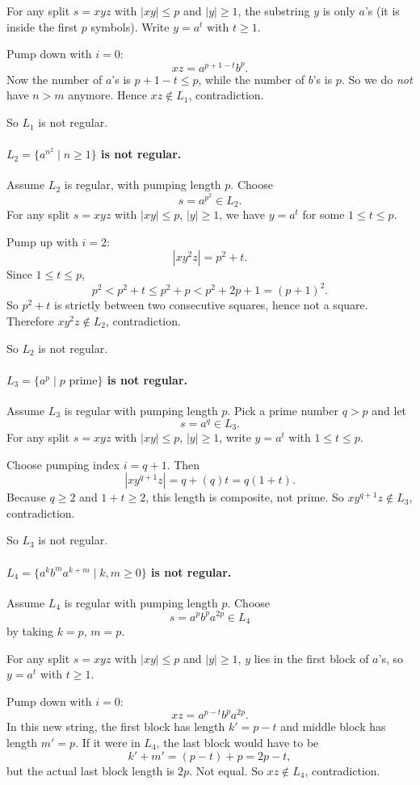 \documentclass{article}
\theoremstyle{theorem}
\theoremstyle{definition}
\theoremstyle{remark}
\begin{document}
For any split $s=xyz$ with $|xy|\le p$ and $|y|\ge 1$, the substring $y$ is only $a$'s (it is inside the first $p$ symbols). Write $y=a^t$ with $t\ge 1$.

Pump down with $i=0$:
\[
xz=a^{p+1-t}b^p.
\]
Now the number of $a$'s is $p+1-t\le p$, while the number of $b$'s is $p$. So we do \emph{not} have $n>m$ anymore. Hence $xz\notin L_1$, contradiction.

So $L_1$ is not regular.

\paragraph{$L_2=\{a^{n^2}\mid n\ge 1\}$ is not regular.}
Assume $L_2$ is regular, with pumping length $p$.
Choose
\[
s=a^{p^2}\in L_2.
\]
For any split $s=xyz$ with $|xy|\le p$, $|y|\ge 1$, we have $y=a^t$ for some $1\le t\le p$.

Pump up with $i=2$:
\[
|xy^2z|=p^2+t.
\]
Since $1\le t\le p$,
\[
p^2 < p^2+t \le p^2+p < p^2+2p+1=(p+1)^2.
\]
So $p^2+t$ is strictly between two consecutive squares, hence not a square. Therefore $xy^2z\notin L_2$, contradiction.

So $L_2$ is not regular.

\paragraph{$L_3=\{a^p\mid p\text{ prime}\}$ is not regular.}
Assume $L_3$ is regular with pumping length $p$.
Pick a prime number $q>p$ and let
\[
s=a^q\in L_3.
\]
For any split $s=xyz$ with $|xy|\le p$, $|y|\ge 1$, write $y=a^t$ with $1\le t\le p$.

Choose pumping index $i=q+1$. Then
\[
|xy^{q+1}z|=q+(q)t=q(1+t).
\]
Because $q\ge 2$ and $1+t\ge 2$, this length is composite, not prime. So $xy^{q+1}z\notin L_3$, contradiction.

So $L_3$ is not regular.

\paragraph{$L_4=\{a^k b^m a^{k+m}\mid k,m\ge 0\}$ is not regular.}
Assume $L_4$ is regular with pumping length $p$.
Choose
\[
s=a^p b^p a^{2p}\in L_4
\]
by taking $k=p$, $m=p$.

For any split $s=xyz$ with $|xy|\le p$ and $|y|\ge 1$, $y$ lies in the first block of $a$'s, so $y=a^t$ with $t\ge 1$.

Pump down with $i=0$:
\[
xz=a^{p-t}b^pa^{2p}.
\]
In this new string, the first block has length $k'=p-t$ and middle block has length $m'=p$. If it were in $L_4$, the last block would have to be
\[
k'+m'=(p-t)+p=2p-t,
\]
but the actual last block length is $2p$. Not equal. So $xz\notin L_4$, contradiction.
\end{document}

